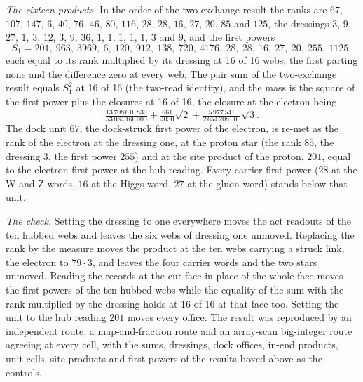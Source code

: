 \begin{chproof}
\textit{The sixteen products.} In the order of the two-exchange result the ranks are $67$, $107$, $147$, $6$, $40$, $76$, $46$, $80$, $116$, $28$, $28$, $16$, $27$, $20$, $85$ and $125$, the dressings $3$, $9$, $27$, $1$, $3$, $12$, $3$, $9$, $36$, $1$, $1$, $1$, $1$, $1$, $3$ and $9$, and the first powers
\begin{equation}
S_1 = 201,\ 963,\ 3969,\ 6,\ 120,\ 912,\ 138,\ 720,\ 4176,\ 28,\ 28,\ 16,\ 27,\ 20,\ 255,\ 1125 ,
\end{equation}
each equal to its rank multiplied by its dressing at 16 of 16 webs, the first parting none and the difference zero at every web. The pair sum of the two-exchange result equals $S_1^{2}$ at 16 of 16 (the two-read identity), and the mass is the square of the first power plus the closures at 16 of 16, the closure at the electron being
\begin{equation}
\tfrac{13\,708\,610\,839}{53\,084\,160\,000}+\tfrac{661}{4050}\sqrt{2}+\tfrac{5\,977\,541}{2\,654\,208\,000}\sqrt{3} .
\end{equation}
The dock unit $67$, the dock-struck first power of the electron, is re-met as the rank of the electron at the dressing one, at the proton star (the rank $85$, the dressing $3$, the first power $255$) and at the site product of the proton, $201$, equal to the electron first power at the hub reading. Every carrier first power ($28$ at the W and Z words, $16$ at the Higgs word, $27$ at the gluon word) stands below that unit.

\textit{The check.} Setting the dressing to one everywhere moves the act readouts of the ten hubbed webs and leaves the six webs of dressing one unmoved. Replacing the rank by the measure moves the product at the ten webs carrying a struck link, the electron to $79\cdot 3$, and leaves the four carrier words and the two stars unmoved. Reading the records at the cut face in place of the whole face moves the first powers of the ten hubbed webs while the equality of the sum with the rank multiplied by the dressing holds at 16 of 16 at that face too. Setting the unit to the hub reading $201$ moves every office. The result was reproduced by an independent route, a map-and-fraction route and an array-scan big-integer route agreeing at every cell, with the sums, dressings, dock offices, in-end products, unit cells, site products and first powers of the results boxed above as the controls.
\end{chproof}
